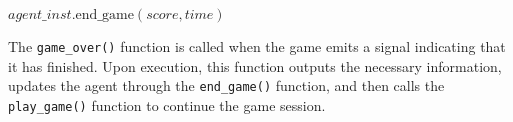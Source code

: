\begin{algorithm}
\begin{algorithmic}[1]
    \State {}
    \State $agent\_inst.\text{end\_game}(score, time)$
    \State {}
\EndFunction
\end{algorithmic}
\end{algorithm}

The \texttt{game\_over()} function is called when the game emits a signal indicating that it has finished. Upon execution, this function outputs the necessary information, updates the agent through the \texttt{end\_game()} function, and then calls the \texttt{play\_game()} function to continue the game session.
